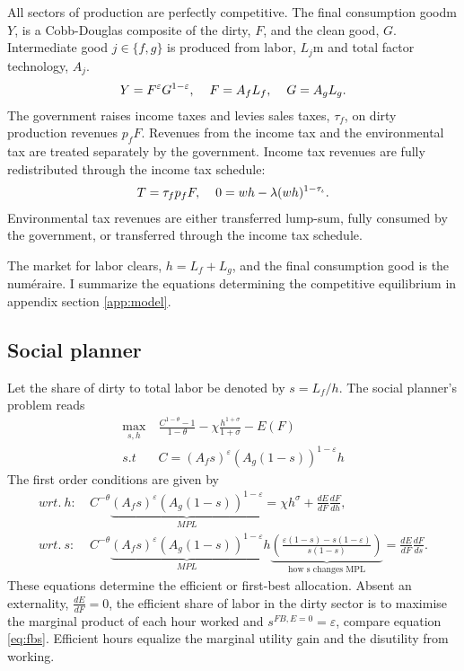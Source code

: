 All sectors of production are perfectly competitive. The final consumption goodm $Y$, is a Cobb-Douglas composite of the dirty, $F$, and the clean good, $G$. Intermediate good $j\in \{f,g\}$ is produced from labor, $L_j$m and total factor technology, $A_j$. 
\begin{align}
Y=F^{\varepsilon}G^{1-
	\varepsilon}, \hspace{4mm}
F=A_fL_f, \hspace{4mm}
G=A_gL_g.
\end{align}
The government raises income taxes and levies sales taxes, $\tau_f$, on dirty production revenues $p_fF$. Revenues from the income tax and the environmental tax are treated separately by the government. Income tax revenues are fully redistributed through the income tax schedule:
\begin{align}
T=\tau_{f}p_fF, \hspace{4mm}
0={w h}-\lambda(w h)^{1-\tau_{\iota}}.
\end{align}
Environmental tax revenues are either transferred lump-sum, fully consumed by the government, or transferred through the income tax schedule.


The market for labor clears, $h=L_f+L_g$, and the final consumption good is the numéraire.
I summarize the equations determining the competitive equilibrium in appendix section \ref{app:model}.

\subsection{Social planner}
Let the share of dirty to total labor be denoted by $s=L_f/h$. The social planner's problem reads
\begin{align}
\underset{s, h}{\max}\ & \frac{C^{1-\theta}-1}{1-\theta}-\chi \frac{h^{1+\sigma}}{1+\sigma}-E(F)\\
s.t\ \ & C=\left(A_fs\right)^{\varepsilon}\left(A_g(1-s)\right)^{1-\varepsilon}h
\end{align}
The first order conditions are given by
\begin{align}
wrt.\ h:\ & C^{-\theta}\underbrace{(A_fs)^{\varepsilon}(A_g(1-s))^{1-\varepsilon}}_{MPL}=\chi h^\sigma+\frac{dE}{dF}\frac{dF}{dh}\label{eq:fbh},\\
wrt.\ s:\ & C^{-\theta}\underbrace{(A_fs)^{\varepsilon}(A_g(1-s))^{1-\varepsilon}}_{MPL}h\underbrace{\left(\frac{\varepsilon(1-s)-s(1-\varepsilon)}{s(1-s)}\right)}_{\text{how s changes MPL}}=\frac{dE}{dF}\frac{dF}{ds}. \label{eq:fbs}
\end{align}
These equations determine the efficient or first-best allocation. 
Absent an externality, $\frac{dE}{dF}=0$, the efficient share of labor in the dirty sector is to maximise the marginal product of each hour worked and $s^{FB,E=0}=\varepsilon$, compare equation \ref{eq:fbs}. Efficient hours equalize the marginal utility gain and the disutility from working. 

